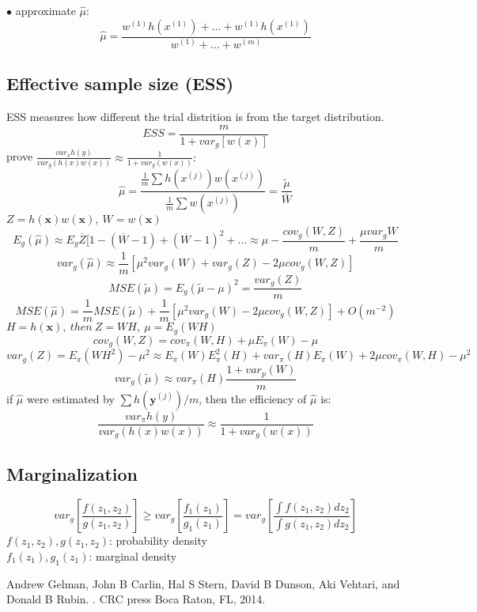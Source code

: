 \documentclass[twoside]{article}
\begin{document}
$\bullet$ approximate $\hat{\mu}$: $$\hat{\mu}=\frac{w^{(1)}h(x^{(1)})+...+w^{(1)}h(x^{(1)})}{w^{(1)}+...+w^{(m)}}$$

\subsection{Effective sample size (ESS)}
ESS measures how different the trial distrition is from the target distribution.
$$ESS=\frac{m}{1+var_g[w(x)]}$$
prove $\frac{var_\pi h(y)}{var_g(h(x)w(x))} \approx  \frac{1}{1+var_g(w(x))}: $\\
$$\hat{\mu}=\frac{\frac{1}{m}\sum h(x^{(j)})w(x^{(j)})}{\frac{1}{m}\sum w(x^{(j)})}=\frac{\tilde{\mu}}{\overline{W}}$$
$Z=h(\mathbf{x})w(\mathbf{x}),\ W=w(\mathbf{x})$\\
$$E_g(\hat{\mu}) \approx E_g{\overline{Z}[1-(\overline{W}-1)+(\overline{W}-1)^2+...} \approx \mu -\frac{cov_g(W,Z)}{m}+\frac{\mu var_g W}{m}$$
$$var_g(\hat{\mu})\approx \frac{1}{m}[\mu^2 var_g(W)+var_g(Z)-2\mu cov_g(W,Z)]$$
$$MSE(\tilde{\mu})=E_g(\tilde{\mu}-\mu)^2=\frac{var_g(Z)}{m}$$
$$MSE(\hat{\mu})=\frac{1}{m}MSE(\tilde{\mu})+\frac{1}{m}[\mu^2 var_g(W)-2\mu cov_g(W,Z)]+O(m^{-2})$$
$H=h(\mathbf{x}),\ then\ Z=WH,\ \mu=E_g(WH) $
$$cov_g(W,Z)=cov_\pi(W,H)+\mu E_\pi(W)-\mu$$
$$var_g(Z)=E_\pi(WH^2)-\mu^2 \approx E_\pi(W)E^2_\pi(H)+var_\pi(H)E_\pi(W)+2\mu cov_\pi(W,H)-\mu^2$$
$$var_g(\tilde{\mu})\approx var_\pi(H) \frac{1+var_p(W)}{m}$$
if $\hat{\mu}$ were estimated by $\sum h(\mathbf{y}^{(j)})/m$, then the efficiency of $\hat{\mu}$ is: \\
$$\frac{var_\pi h(y)}{var_g(h(x)w(x))} \approx  \frac{1}{1+var_g(w(x))}$$


\subsection{Marginalization}
$$var_g[\frac{f(z_1,z_2)}{g(z_1,z_2)}] \geq var_g[\frac{f_1(z_1)}{g_1(z_1)}]= var_g[\frac{\int f(z_1,z_2)dz_2}{\int g(z_1,z_2)dz_2}]$$
$f(z_1,z_2), g(z_1,z_2)$: probability density\\
$f_1(z_1),g_1(z_1)$: marginal density

\begin{thebibliography}{}

Andrew Gelman, John B Carlin, Hal S Stern, David B Dunson, Aki Vehtari, and Donald B Rubin.
.
\newblock CRC press Boca Raton, FL, 2014.

\end{thebibliography}
\end{document}

